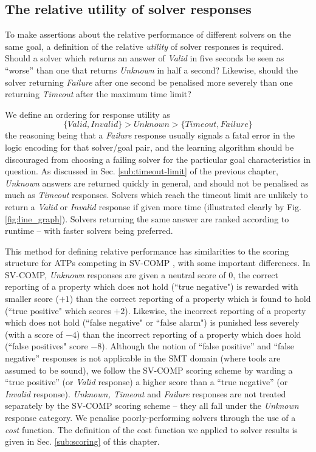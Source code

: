 \subsection{The relative utility of solver responses}
\label{sub:rel-util}

To make assertions about the relative performance of different solvers on the same goal, a definition of the relative \textit{utility} of solver responses is required.
Should a solver which returns an answer of \textit{Valid} in five seconds be seen as ``worse'' than one that returns \textit{Unknown} in half a second? 
Likewise, should the solver returning \textit{Failure} after one second be penalised more severely than one returning \textit{Timeout} after the maximum time limit?

We define an ordering for response utility as 
\[
\lbrace Valid, Invalid\rbrace > Unknown > \lbrace Timeout, Failure\rbrace
\]  
the reasoning being that a \textit{Failure} response usually signals a fatal error in the logic encoding for that solver/goal pair, and the learning algorithm should be discouraged from choosing a failing solver for the particular goal characteristics in question. 
As discussed in Sec. \ref{sub:timeout-limit} of the previous chapter, \textit{Unknown} answers are returned quickly in general, and should not be penalised as much as \textit{Timeout} responses. 
Solvers which reach the timeout limit are unlikely to return a \textit{Valid} or \textit{Invalid} response if given more time (illustrated clearly by Fig. \ref{fig:line_graph}).
Solvers returning the same answer are ranked according to runtime -- with faster solvers being preferred.

This method for defining relative performance has similarities to the scoring structure for ATPs competing in SV-COMP \cite{Beyer2016, SVCOMP}, with some important differences. 
In SV-COMP, \textit{Unknown} responses are given a neutral score of 0, the correct reporting of a property which does not hold (``true negative") is rewarded with smaller score ($+1$) than the correct reporting of a property which is found to hold (``true positive" which scores $+2$).
Likewise, the incorrect reporting of a property which does not hold (``false negative" or ``false alarm") is punished less severely (with a score of $-4$) than the incorrect reporting of a property which does hold (``false positives" score $-8$).  
Although the notion of ``false positive'' and ``false negative'' responses is not applicable in the SMT domain (where tools are assumed to be sound), we follow the SV-COMP scoring scheme by warding a ``true positive'' (or \textit{Valid} response) a higher score than a ``true negative'' (or \textit{Invalid} response). 
\textit{Unknown, Timeout} and \textit{Failure} responses are not treated separately by the SV-COMP scoring scheme -- they all fall under the \textit{Unknown} response category.
We penalise poorly-performing solvers through the use of a \textit{cost} function.
The definition of the cost function we applied to solver results is given in Sec. \ref{sub:scoring} of this chapter. 


